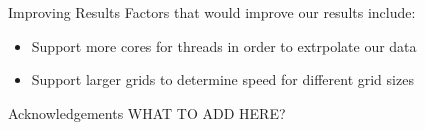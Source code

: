 \documentclass[final]{beamer}
\newlength{\onecolwid}
\begin{document}
\begin{frame}[t]
\begin{columns}[t]
\begin{column}{\onecolwid}
\begin{block}{Improving Results}
Factors that would improve our results include:
\begin{itemize}
\item Support more cores for threads in order to extrpolate our data
\item Support larger grids to determine speed for different grid sizes
\end{itemize}

\end{block}



\begin{block}{Acknowledgements}
WHAT TO ADD HERE?

\end{block}


\end{column} %

\end{columns} %

\end{frame} %
\end{document}
